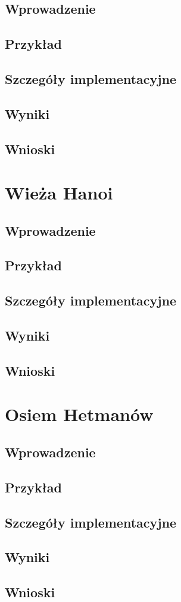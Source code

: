     \subsection{Wprowadzenie}
    \subsection{Przykład}
    \subsection{Szczegóły implementacyjne}
    \subsection{Wyniki}
    \subsection{Wnioski}
\section{Wieża Hanoi}
    \subsection{Wprowadzenie}
    \subsection{Przykład}
    \subsection{Szczegóły implementacyjne}
    \subsection{Wyniki}
    \subsection{Wnioski}
\section{Osiem Hetmanów}
    \subsection{Wprowadzenie}
    \subsection{Przykład}
    \subsection{Szczegóły implementacyjne}
    \subsection{Wyniki}
    \subsection{Wnioski}